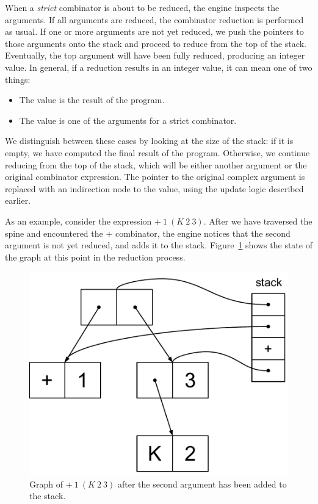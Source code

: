 \documentclass[conference]{IEEEtran}
\begin{document}
When a \textit{strict} combinator is about to be reduced, the engine inspects the arguments.
If all arguments are reduced, the combinator reduction is performed as usual.
If one or more arguments are not yet reduced, we push the pointers to those arguments onto the stack and proceed to reduce from the top of the stack.
Eventually, the top argument will have been fully reduced, producing an integer value.
In general, if a reduction results in an integer value, it can mean one of two things:
\begin{itemize}
    \item The value is the result of the program.
    \item The value is one of the arguments for a strict combinator.
\end{itemize}
We distinguish between these cases by looking at the size of the stack: if it is empty, we have computed the final result of the program.
Otherwise, we continue reducing from the top of the stack, which will be either another argument or the original combinator expression.
The pointer to the original complex argument is replaced with an indirection node to the value, using the update logic described earlier.

As an example, consider the expression $+ \ 1 \ (K \ 2 \ 3)$.
After we have traversed the spine and encountered the $+$ combinator, the engine notices that the second argument is not yet reduced, and adds it to the stack.
Figure~\ref{fig:add_step1} shows the state of the graph at this point in the reduction process.

\begin{figure}
    \includegraphics[width=.8\columnwidth]{add_step1}
    \centering
    \caption{
        Graph of $+ \ 1 \ (K \ 2 \ 3)$ after the second argument has been added to the stack.
    }
    \label{fig:add_step1}
\end{figure}
\end{document}
